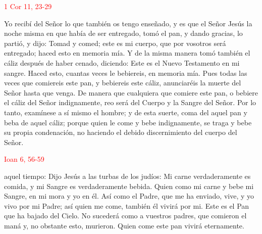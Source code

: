 \documentclass[10pt]{article}
\begin{document}
\begin{multicols}{2}
      \hfill\textcolor{red}{1 Cor 11, 23-29}

      Yo recibí del Señor lo que también os tengo enseñado, y es que el Señor Jesús la noche misma en que había de ser entregado, tomó el pan, y dando gracias, lo partió, y dijo:
      Tomad y comed; este es mi cuerpo, que por vosotros será entregado; haced esto en memoria mía. Y de la misma manera tomó también el cáliz después de haber cenado, diciendo: Este es el
      Nuevo Testamento en mi sangre. Haced esto, cuantas veces le bebiereis, en memoria mía. Pues todas las veces que comiereis este pan, y bebiereis este cáliz, anunciaréis la muerte del
      Señor hasta que venga. De manera que cualquiera que comiere este pan, o bebiere el cáliz del Señor indignamente, reo será del Cuerpo y la Sangre del Señor. Por lo tanto, examínese a
      sí mismo el hombre; y de esta suerte, coma del aquel pan y beba de aquel cáliz; porque quien le come y bebe indignamente, se traga y bebe su propia condenación, no haciendo el debido
      discernimiento del cuerpo del Señor.

      \vspace{2mm}

      \hfill\textcolor{red}{Ioan 6, 56-59}

      aquel tiempo: Dijo Jesús a las turbas de los judíos: Mi carne verdaderamente es comida, y mi Sangre es verdaderamente bebida. Quien como mi carne y bebe mi Sangre, en mi mora y yo en él.
      Así como el Padre, que me ha enviado, vive, y yo vivo por mi Padre; así quien me come, también él vivirá por mi. Este es el Pan que ha bajado del Cielo. No sucederá como a vuestros padres,
      que comieron el maná y, no obstante esto, murieron. Quien come este pan vivirá eternamente.

      \vspace{2mm}

      \begin{otherlanguage}{latin}
            

            \vspace{1mm}

            

            \vspace{1mm}

            
      \end{otherlanguage}


\end{multicols}
\end{document}
